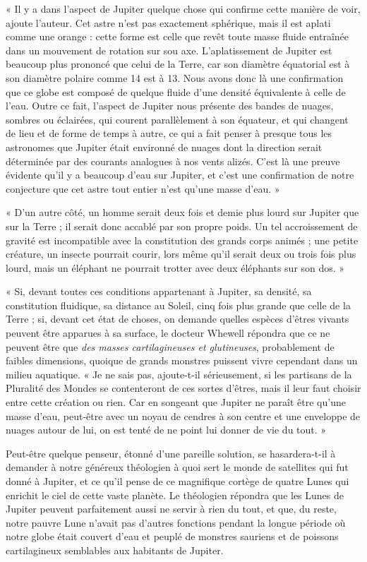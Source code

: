 \documentclass[a4paper, 11pt, oneside, landscape]{article}
\begin{document}
« Il y a dans l'aspect de Jupiter quelque chose qui confirme cette manière de voir, ajoute l'auteur. Cet astre n'est pas exactement sphérique, mais il est aplati comme une orange : cette forme est celle que revêt toute masse fluide entraînée dans un mouvement de rotation sur sou axe. L'aplatissement de Jupiter est beaucoup plus prononcé que celui de la Terre, car son diamètre équatorial est à son diamètre polaire comme 14 est à 13. Nous avons donc là une confirmation que ce globe est composé de quelque fluide d'une densité équivalente à celle de l'eau. Outre ce fait, l'aspect de Jupiter nous présente des bandes de nuages, sombres ou éclairées, qui courent parallèlement à son équateur, et qui changent de lieu et de forme de temps à autre, ce qui a fait penser à presque tous les astronomes que Jupiter était environné de nuages dont la direction serait déterminée par des courants analogues à nos vents alizés. C'est là une preuve évidente qu'il y a beaucoup d'eau sur Jupiter, et c'est une confirmation de notre conjecture que cet astre tout entier n'est qu'une masse d'eau. »

« D'un autre côté, un homme serait deux fois et demie plus lourd sur Jupiter que sur la Terre ; il serait donc accablé par son propre poids. Un tel accroissement de gravité est incompatible avec la constitution des grands corps animés ; une petite créature, un insecte pourrait courir, lors même qu'il serait deux ou trois fois plus lourd, mais un éléphant ne pourrait trotter avec deux éléphants sur son dos. »

« Si, devant toutes ces conditions appartenant à Jupiter, sa densité, sa constitution fluidique, sa distance au Soleil, cinq fois plus grande que celle de la Terre ; si, devant cet état de choses, on demande quelles espèces d'êtres vivants peuvent être apparues à sa surface, le docteur Whewell répondra que ce ne peuvent être que \emph{des masses cartilagineuses et glutineuses}, probablement de faibles dimensions, quoique de grands monstres puissent vivre cependant dans un milieu aquatique. « Je ne sais pas, ajoute-t-il sérieusement, si les partisans de la Pluralité des Mondes se contenteront de ces sortes d'êtres, mais il leur faut choisir entre cette création ou rien. Car en songeant que Jupiter ne paraît être qu'une masse d'eau, peut-être avec un noyau de cendres à son centre et une enveloppe de nuages autour de lui, on est tenté de ne point lui donner de vie du tout. »

Peut-être quelque penseur, étonné d'une pareille solution, se hasardera-t-il à demander à notre généreux théologien à quoi sert le monde de satellites qui fut donné à Jupiter, et ce qu'il pense de ce magnifique cortège de quatre Lunes qui enrichit le ciel de cette vaste planète. Le théologien répondra que les Lunes de Jupiter peuvent parfaitement aussi ne servir à rien du tout, et que, du reste, notre pauvre Lune n'avait pas d'autres fonctions pendant la longue période où notre globe était couvert d'eau et peuplé de monstres sauriens et de poissons cartilagineux semblables aux habitants de Jupiter.
\end{document}
